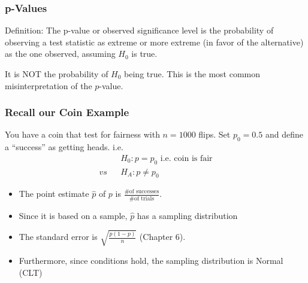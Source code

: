 \documentclass[handout]{beamer}
\newcommand{\blue}[1]{\textcolor{blue2}{#1}}
\begin{document}
\begin{frame}
\frametitle{p-Values}
%
%
Definition:  The \blue{p-value} or \blue{observed significance level} is the probability of observing a test statistic as extreme or more extreme (in favor of the alternative) as the one observed, assuming $H_0$ is true.

\vspace{0.5cm}

\pause It is \blue{NOT} the probability of $H_0$ being true.  This is the most common misinterpretation of the $p$-value.

\end{frame}


%
%
%
%


\begin{frame}
\frametitle{Recall our Coin Example}

%
%
You have a coin that test for fairness with $n=1000$ flips.  Set $p_0 = 0.5$ and define a ``success'' as getting heads.  \pause i.e.
\begin{eqnarray*}
&& H_0: p = p_0 \mbox{ i.e. coin is fair}\\
vs && H_A: p \neq p_0
\end{eqnarray*}

\begin{itemize}
\pause \item The point estimate $\widehat{p}$ of $p$ is $\frac{\mbox{\# of successes}}{\mbox{\# of trials}}$.
\pause \item Since it is based on a sample, $\widehat{p}$ has a sampling distribution
\pause \item The standard error is $\sqrt{\frac{p(1-p)}{n}}$ (Chapter 6).
\pause \item Furthermore, since conditions hold, the sampling distribution is Normal (CLT)
\end{itemize}
\end{frame}
\end{document}
